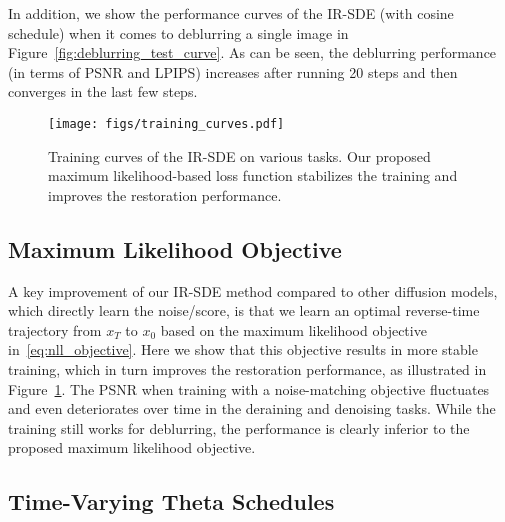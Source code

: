 \documentclass{article}
\theoremstyle{plain}
\theoremstyle{definition}
\theoremstyle{remark}
\begin{document}
In addition, we show the performance curves of the IR-SDE (with cosine schedule) when it comes to deblurring a single image in Figure~\ref{fig:deblurring_test_curve}. As can be seen, the deblurring performance (in terms of PSNR and LPIPS) increases after running 20 steps and then converges in the last few steps.


\begin{figure}[t]
\begin{center}
\centerline{\texttt{[image: figs/training\_curves.pdf]}}\vspace{-2.0mm}
\caption{Training curves of the IR-SDE on various tasks. Our proposed maximum likelihood-based loss function stabilizes the training and improves the restoration performance.}
\label{fig:loss_curves}
\end{center}
\vskip -0.2in
\end{figure}

\subsection{Maximum Likelihood Objective}
\label{sec:discuss_objective}
A key improvement of our IR-SDE method compared to other diffusion models, which directly learn the noise/score, is that we learn an optimal reverse-time trajectory from ${x}_T$ to ${x}_0$ based on the maximum likelihood objective in~\eqref{eq:nll_objective}. Here we show that this objective results in more stable training, which in turn improves the restoration performance, as illustrated in Figure~\ref{fig:loss_curves}. The PSNR when training with a noise-matching objective fluctuates and even deteriorates over time in the deraining and denoising tasks. While the training still works for deblurring, the performance is clearly inferior to the proposed maximum likelihood objective.



\subsection{Time-Varying Theta Schedules}
\label{section:discussion:theta}
\end{document}
